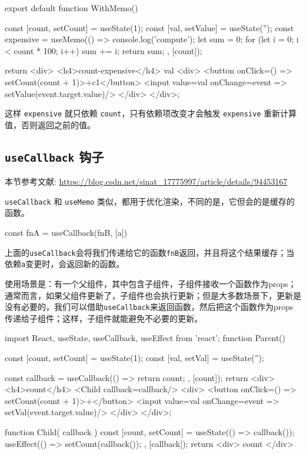 \begin{JavaScript}
export default function WithMemo() {
  const [count, setCount] = useState(1);
  const [val, setValue] = useState('');
  const expensive = useMemo(() => {
      console.log('compute');
      let sum = 0;
      for (let i = 0; i < count * 100; i++) {
          sum += i;
      }
      return sum;
  }, [count]);

  return <div>
      <h4>{count}-{expensive}</h4>
      {val}
      <div>
          <button onClick={() => setCount(count + 1)}>+c1</button>
          <input value={val} onChange={event => setValue(event.target.value)}/>
      </div>
  </div>;
}
\end{JavaScript}

这样 \texttt{expensive} 就只依赖 \texttt{count}，只有依赖项改变才会触发 \texttt{expensive} 重新计算值，否则返回之前的值。

\subsection{\texttt{useCallback} 钩子}

本节参考文献: \url{https://blog.csdn.net/sinat_17775997/article/details/94453167}

\texttt{useCallback} 和 \texttt{useMemo} 类似，都用于优化渲染，不同的是，它但会的是缓存的函数。

\begin{JavaScript}
const fnA = useCallback(fnB, [a])
\end{JavaScript}

上面的\texttt{useCallback}会将我们传递给它的函数\texttt{fnB}返回，并且将这个结果缓存；当依赖\texttt{a}变更时，会返回新的函数。

使用场景是：有一个父组件，其中包含子组件，子组件接收一个函数作为props；通常而言，如果父组件更新了，子组件也会执行更新；但是大多数场景下，更新是没有必要的，我们可以借助\texttt{useCallback}来返回函数，然后把这个函数作为props传递给子组件；这样，子组件就能避免不必要的更新。

\begin{JavaScript}
import React, { useState, useCallback, useEffect } from 'react';
function Parent() {
    const [count, setCount] = useState(1);
    const [val, setVal] = useState('');
 
    const callback = useCallback(() => {
        return count;
    }, [count]);
    return <div>
        <h4>{count}</h4>
        <Child callback={callback}/>
        <div>
            <button onClick={() => setCount(count + 1)}>+</button>
            <input value={val} onChange={event => setVal(event.target.value)}/>
        </div>
    </div>;
}
 
function Child({ callback }) {
    const [count, setCount] = useState(() => callback());
    useEffect(() => {
        setCount(callback());
    }, [callback]);
    return <div>
        {count}
    </div>
}
\end{JavaScript}

